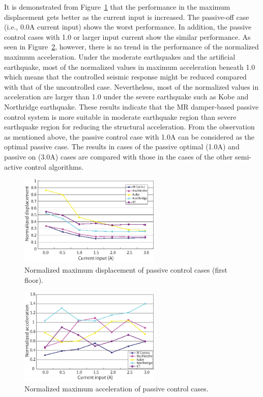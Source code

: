 It is demonstrated from Figure~\ref{fig:n3-12} that the performance in the maximum displacement gets better as the current input is increased. The passive-off case (i.e., 0.0A current input) shows the worst performance. In addition, the passive control cases with 1.0 or larger input current show the similar performance. As seen in Figure~\ref{fig:n3-13}, however, there is no trend in the performance of the normalized maximum acceleration. Under the moderate earthquakes and the artificial earthquake, most of the normalized values in maximum acceleration beneath 1.0 which means that the controlled seismic response might be reduced compared with that of the uncontrolled case. Nevertheless, most of the normalized values in acceleration are larger than 1.0 under the severe earthquake such as Kobe and Northridge earthquake. These results indicate that the MR damper-based passive control system is more suitable in moderate earthquake region than severe earthquake region for reducing the structural acceleration. From the observation as mentioned above, the passive control case with 1.0A can be considered as the optimal passive case. The results in cases of the passive optimal (1.0A) and passive on (3.0A) cases are compared with those in the cases of the other semi-active control algorithms.

\begin{figure}[!ht]
\centering
\includegraphics[width=0.6\textwidth] {figure/n3-12.eps}
\caption{Normalized maximum displacement of passive control
cases (first floor).}
\label{fig:n3-12}
\end{figure}

\begin{figure}[!ht]
\centering
\includegraphics[width=0.6\textwidth] {figure/n3-13.eps}
\caption{Normalized maximum acceleration of passive control
cases.}
\label{fig:n3-13}
\end{figure}

